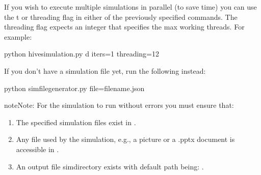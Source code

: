 \documentclass[letterpaper,10pt,english]{sphinxmanual}
\begin{document}
If you wish to execute multiple simulations in parallel (to save time) you
can use the \sphinxhyphen{}t or \textendash{}threading flag in either of the previously specified
commands. The threading flag expects an integer that specifies the max
working threads. For example:

\begin{sphinxVerbatim}[commandchars=\\\{\}]
\PYGZdl{} python hive\PYGZus{}simulation.py \PYGZhy{}d \PYGZhy{}\PYGZhy{}iters=1 \PYGZhy{}\PYGZhy{}threading=12
\end{sphinxVerbatim}

If you don’t have a simulation file yet, run the following instead:

\begin{sphinxVerbatim}[commandchars=\\\{\}]
\PYGZdl{} python simfile\PYGZus{}generator.py \PYGZhy{}\PYGZhy{}file=filename.json
\end{sphinxVerbatim}

\begin{sphinxadmonition}{note}{Note:}
For the simulation to run without errors you must ensure that:
\begin{enumerate}
%
\item {} 
The specified simulation files exist in         {\hyperref[\detokenize{app:app.environment_settings.SIMULATION_ROOT}]{}}.

\item {} 
Any file used by the simulation, e.g., a picture or a .pptx         document is accessible in         {\hyperref[\detokenize{app:app.environment_settings.SHARED_ROOT}]{}}.

\item {} 
An output file simdirectory exists with default path being:         {\hyperref[\detokenize{app:app.environment_settings.OUTFILE_ROOT}]{}}.

\end{enumerate}
\end{sphinxadmonition}
\end{document}
